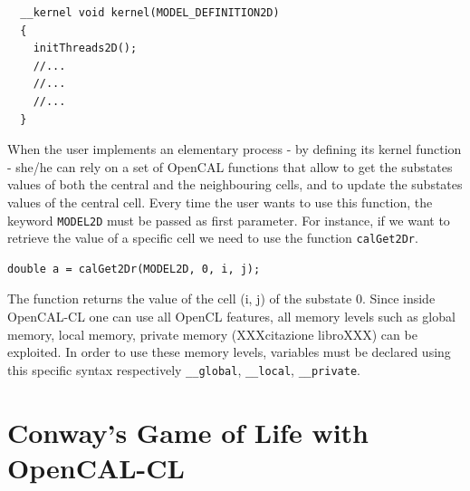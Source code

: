 \begin{lstlisting} 
  __kernel void kernel(MODEL_DEFINITION2D)
  {
    initThreads2D();
    //...
    //...
    //...
  }
\end{lstlisting}

When the user implements an elementary process - by defining
its kernel function - she/he can rely on a set of OpenCAL functions
that allow to get the substates values of both the central and the
neighbouring cells, and to update the substates values of the central
cell. Every time the user wants to use this function, the keyword \verb'MODEL2D' must be passed
as first parameter. For instance, if we
want to retrieve the value of a specific cell we need to use the function
\verb'calGet2Dr'.

\begin{lstlisting}[numbers=none] 
	double a = calGet2Dr(MODEL2D, 0, i, j);
\end{lstlisting}

The function returns the value of the cell (i, j) of the substate
0. Since inside OpenCAL-CL one can use all OpenCL features, all
memory levels such as global memory, local memory, private memory
(XXXcitazione libroXXX) can be exploited. In order to use these memory
levels, variables must be declared using this specific syntax
respectively \verb'__global', \verb'__local', \verb'__private'.

\section{Conway's Game of Life with OpenCAL-CL}
 
